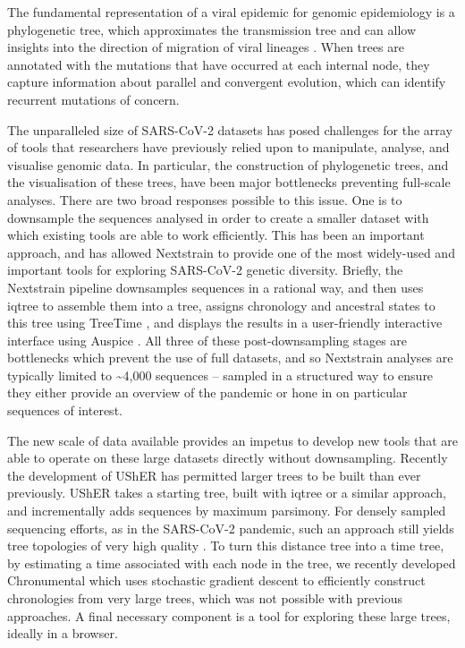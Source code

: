 \documentclass[twocolumn]{bioRxiv}
\begin{document}
The fundamental representation of a viral epidemic for genomic epidemiology is a phylogenetic tree, which approximates the transmission tree and can allow insights into the direction of migration of viral lineages \citep{pmid27501264}. When trees are annotated with the mutations that have occurred at each internal node, they capture information about parallel and convergent evolution, which can identify recurrent mutations of concern.

The unparalleled size of SARS-CoV-2 datasets has posed challenges for the array of tools that researchers have previously relied upon to manipulate, analyse, and visualise genomic data. In particular, the construction of phylogenetic trees, and the visualisation of these trees, have been major bottlenecks preventing full-scale analyses. There are two broad responses possible to this issue. One is to downsample the sequences analysed in order to create a smaller dataset with which existing tools are able to work efficiently. This has been an important approach, and has allowed Nextstrain \citep{Nextstrain} to provide one of the most widely-used and important tools for exploring SARS-CoV-2 genetic diversity. Briefly, the Nextstrain pipeline downsamples sequences in a rational way, and then uses iqtree \citep{iqtree} to assemble them into a tree, assigns chronology and ancestral states to this tree using TreeTime \citep{treetime}, and displays the results in a user-friendly interactive interface using Auspice \citep{Nextstrain}. All three of these post-downsampling stages are bottlenecks which prevent the use of full datasets, and so Nextstrain analyses are typically limited to \textasciitilde4,000 sequences -- sampled in a structured way to ensure they either provide an overview of the pandemic or hone in on particular sequences of interest.


The new scale of data available provides an impetus to develop new tools that are able to operate on these large datasets directly without downsampling. Recently the development of UShER \citep{usher} has permitted larger trees to be built than ever previously. UShER takes a starting tree, built with iqtree or a similar approach, and incrementally adds sequences by maximum parsimony. For densely sampled sequencing efforts, as in the SARS-CoV-2 pandemic, such an approach still yields tree topologies of very high quality \citep{Thornlow2021.12.02.471004}. To turn this distance tree into a time tree, by estimating a time associated with each node in the tree, we recently developed Chronumental \citep{chronumental} which uses stochastic gradient descent to efficiently construct chronologies from very large trees, which was not possible with previous approaches. A final necessary component is a tool for exploring these large trees, ideally in a browser.
\end{document}
